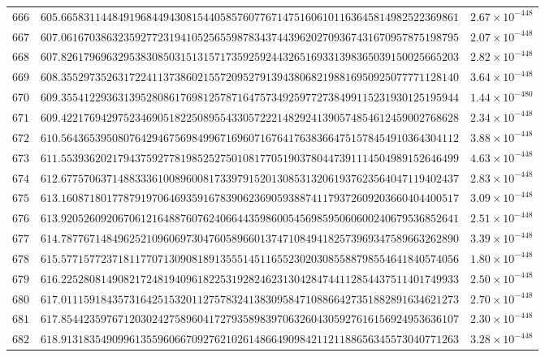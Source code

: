 \documentclass[12pt,reqno]{amsart}
\theoremstyle{remark}
\begin{document}
\begin{longtable}{clc}
$666$ & $605.6658311448491968449430815440585760776714751606101163645814982522369861$ & $2.67\times 10^{-448}$ \\
$667$ & $607.0616703863235927723194105256559878343744396202709367431670957875198795$ & $2.07\times 10^{-448}$ \\
$668$ & $607.8261796963295383085031513157173592592443265169331398365039150025665203$ & $2.82\times 10^{-448}$ \\
$669$ & $608.3552973526317224113738602155720952791394380682198816950925077771128140$ & $3.64\times 10^{-448}$ \\
$670$ & $609.3554122936313952808617698125787164757349259772738499115231930125195944$ & $1.44\times 10^{-480}$ \\
$671$ & $609.4221769429752346905182250895543305722214829241390574854612459002768628$ & $2.34\times 10^{-448}$ \\
$672$ & $610.5643653950807642946756984996716960716764176383664751578454910364304112$ & $3.88\times 10^{-448}$ \\
$673$ & $611.5539362021794375927781985252750108177051903780447391114504989152646499$ & $4.63\times 10^{-448}$ \\
$674$ & $612.6775706371488333610089600817339791520130853132061937623564047119402437$ & $2.83\times 10^{-448}$ \\
$675$ & $613.1608718017787919706469359167839062369059388741179372609203660404400517$ & $3.09\times 10^{-448}$ \\
$676$ & $613.9205260920670612164887607624066443598600545698595060600240679536852641$ & $2.51\times 10^{-448}$ \\
$677$ & $614.7877671484962521096069730476058966013747108494182573969347589663262890$ & $3.39\times 10^{-448}$ \\
$678$ & $615.5771577237181177071309081891355514511655230203085588798554641840574056$ & $1.80\times 10^{-448}$ \\
$679$ & $616.2252808149082172481940961822531928246231304284744112854437511401749933$ & $2.50\times 10^{-448}$ \\
$680$ & $617.0111591843573164251532011275783241383095847108866427351882891634621273$ & $2.70\times 10^{-448}$ \\
$681$ & $617.8544235976712030242758960417279358983970632604305927616156924953636107$ & $2.30\times 10^{-448}$ \\
$682$ & $618.9131835490996135596066709276210261486649098421121188656345573040771263$ & $3.28\times 10^{-448}$ \\

\end{longtable}
\end{document}
